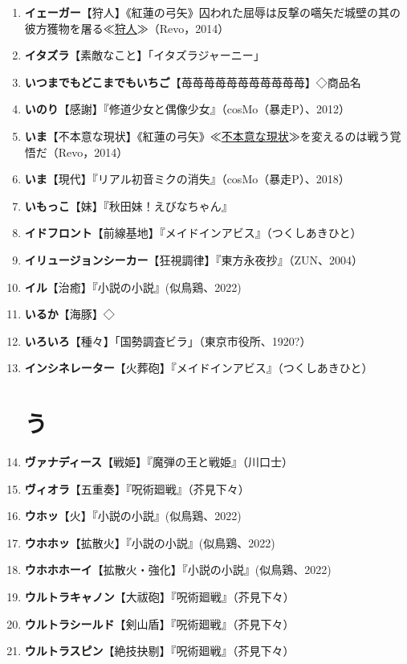 \documentclass[twocolumn]{jsbook}
\newcommand{\ccite}[1]{《#1》}
\newcommand{\NoLabSectionTable}[1]{
    \section*{#1}
    \addcontentsline{toc}{section}{#1}
}
\begin{document}
\begin{enumerate}
    \item \textbf{イェーガー}【狩人】\ccite{紅蓮の弓矢}{囚われた屈辱は反撃の嚆矢だ城壁の其の彼方獲物を屠る≪\uline{狩人}≫（Revo，2014）}
    \item \textbf{イタズラ}【素敵なこと】「イタズラジャーニー」
    \item \textbf{いつまでもどこまでもいちご}【苺苺苺苺苺苺苺苺苺苺苺】◇商品名
    \item \textbf{いのり}【感謝】『修道少女と偶像少女』（cosMo（暴走P）、2012）
    \item \textbf{いま}【不本意な現状】\ccite{紅蓮の弓矢}{≪\uline{不本意な現状}≫を変えるのは戦う覚悟だ（Revo，2014）}
    \item \textbf{いま}【現代】『リアル初音ミクの消失』（cosMo（暴走P）、2018）
    \item \textbf{いもっこ}【妹】『秋田妹！えびなちゃん』
    \item \textbf{イドフロント}【前線基地】『メイドインアビス』（つくしあきひと）
    \item \textbf{イリュージョンシーカー}【狂視調律】『東方永夜抄』（ZUN、2004）
    \item \textbf{イル}【治癒】『小説の小説』(似鳥鶏、2022)
    \item \textbf{いるか}【海豚】◇
    \item \textbf{いろいろ}【種々】「国勢調査ビラ」（東京市役所、1920?）
    \item \textbf{インシネレーター}【火葬砲】『メイドインアビス』（つくしあきひと）

\NoLabSectionTable{う}

    \item \textbf{ヴァナディース}【戦姫】『魔弾の王と戦姫』（川口士）
    \item \textbf{ヴィオラ}【五重奏】『呪術廻戦』（芥見下々）
    \item \textbf{ウホッ}【火】『小説の小説』(似鳥鶏、2022)
    \item \textbf{ウホホッ}【拡散火】『小説の小説』(似鳥鶏、2022)
    \item \textbf{ウホホホーイ}【拡散火・強化】『小説の小説』(似鳥鶏、2022)
    \item \textbf{ウルトラキャノン}【大祓砲】『呪術廻戦』（芥見下々）
    \item \textbf{ウルトラシールド}【剣山盾】『呪術廻戦』（芥見下々）
    \item \textbf{ウルトラスピン}【絶技抉剔】『呪術廻戦』（芥見下々）


\end{enumerate}
\end{document}
